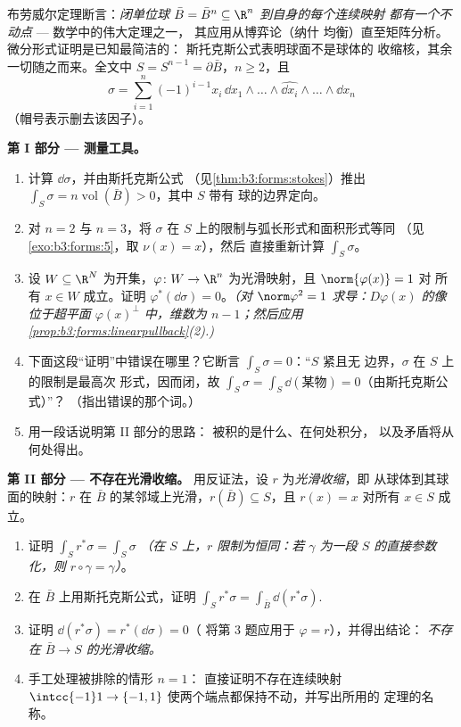 \begin{problem}\label{pb:b3:forms:1}
布劳威尔定理断言：\emph{闭单位球
$\bar B = \bar B^n \subseteq \R^n$ 到自身的每个连续映射
都有一个不动点} --- 数学中的伟大定理之一，
其应用从博弈论（纳什
均衡）直至矩阵分析。微分形式证明是已知最简洁的：
斯托克斯公式表明球面不是球体的
收缩核，其余一切随之而来。全文中
$S = S^{n-1} = \partial\bar B$，$n \geq 2$，且
\[
\sigma = \sum_{i=1}^n(-1)^{i-1}x_i\,
\dd x_1\wedge\dots\wedge\widehat{\dd x_i}\wedge\dots\wedge
\dd x_n
\]
（帽号表示删去该因子）。

\medskip
\noindent\textbf{第 I 部分 --- 测量工具。}
\begin{enumerate}
  \item 计算 $\dd\sigma$，并由斯托克斯公式
        （见\cref{thm:b3:forms:stokes}）推出 $\int_S\sigma =
        n\operatorname{vol}(\bar B) > 0$，其中 $S$ 带有
        球的边界定向。
  \item 对 $n = 2$ 与 $n = 3$，将
        $\sigma$ 在 $S$ 上的限制与弧长形式和面积形式等同
        （见\cref{exo:b3:forms:5}，取 $\nu(x) = x$），然后
        直接重新计算 $\int_S\sigma$。
  \item 设 $W \subseteq \R^N$ 为开集，$\varphi\colon W
        \to \R^n$ 为光滑映射，且 $\norm{\varphi(x)} = 1$ 对
        所有 $x \in W$ 成立。证明
        $\varphi^*(\dd\sigma) = 0$。\emph{（对
        $\norm\varphi^2 = 1$ 求导：$D\varphi(x)$ 的像
        位于超平面 $\varphi(x)^\perp$ 中，维数为
        $n - 1$；然后应用
        \cref{prop:b3:forms:linearpullback}(2).)}
  \item 下面这段“证明”中错误在哪里？它断言
        $\int_S\sigma = 0$：“$S$ 紧且无
        边界，$\sigma$ 在 $S$ 上的限制是最高次
        形式，因而闭，故 $\int_S\sigma =
        \int_S\dd(\text{某物}) = 0$（由斯托克斯公式）”？
        （指出错误的那个词。）
  \item 用一段话说明第 II 部分的思路：
        被积的是什么、在何处积分，
        以及矛盾将从何处得出。
\end{enumerate}

\medskip
\noindent\textbf{第 II 部分 --- 不存在光滑收缩。} 用反证法，设
$r$ 为\emph{光滑收缩}，即
从球体到其球面的映射：$r$ 在
$\bar B$ 的某邻域上光滑，$r(\bar B) \subseteq S$，且 $r(x) = x$ 对所有
$x \in S$ 成立。
\begin{enumerate}[resume]
  \item 证明 $\int_Sr^*\sigma = \int_S\sigma$
        \emph{（在 $S$ 上，$r$ 限制为恒同：若
        $\gamma$ 为一段
        $S$ 的直接参数化，则 $r\circ\gamma = \gamma$）}。
  \item 在 $\bar B$ 上用斯托克斯公式，证明 $\int_Sr^*\sigma =
        \int_{\bar B}\dd(r^*\sigma)$.
  \item 证明 $\dd(r^*\sigma) = r^*(\dd\sigma) = 0$（
        将第 3 题应用于 $\varphi = r$），并得出结论：
        \emph{不存在 $\bar B \to S$ 的光滑收缩。}
  \item 手工处理被排除的情形 $n = 1$：
        直接证明不存在连续映射 $\intcc{-1}1 \to
        \{-1, 1\}$ 使两个端点都保持不动，并写出所用的
        定理的名称。
\end{enumerate}


\end{problem}
